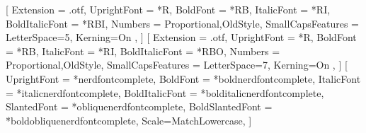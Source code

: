 \usepackage{ifpdf,ifluatex}

\usepackage{grffile}

\usepackage{indentfirst,xspace}

\usepackage{graphicx,xcolor}

\usepackage{booktabs}
\renewcommand{\arraystretch}{1.2}  %

\let\oldtabular\tabular
\let\endoldtabular\endtabular
\renewenvironment{tabular}[1]{\begin{oldtabular}{@{}#1@{}}}{\end{oldtabular}}

\usepackage{amsmath,amssymb}

\ifluatex
  \usepackage{fontspec}
  \setmainfont{LinLibertine_}[
    Extension = .otf,
    UprightFont = *R,
    BoldFont = *RB,
    ItalicFont = *RI,
    BoldItalicFont = *RBI,
    Numbers = {Proportional,OldStyle},
    SmallCapsFeatures = { LetterSpace=5, Kerning=On },
  ]
  \setsansfont{LinBiolinum_}[
    Extension = .otf,
    UprightFont = *R,
    BoldFont = *RB,
    ItalicFont = *RI,
    BoldItalicFont = *RBO,
    Numbers = {Proportional,OldStyle},
    SmallCapsFeatures = { LetterSpace=7, Kerning=On },
  ]
  \setmonofont{iosevkatermslab}[
    UprightFont = *nerdfontcomplete,
    BoldFont = *boldnerdfontcomplete,
    ItalicFont = *italicnerdfontcomplete,
    BoldItalicFont = *bolditalicnerdfontcomplete,
    SlantedFont = *obliquenerdfontcomplete,
    BoldSlantedFont = *boldobliquenerdfontcomplete,
    Scale=MatchLowercase,
  ]
  \usepackage{unicode-math}

  \newcommand\lfstyle{\addfontfeature{Numbers=Lining}}
  \newcommand\textlf[1]{{\lfstyle #1}}
\else
  \usepackage[T1]{fontenc}
  \usepackage[utf8]{inputenc}
  \usepackage[p,osf]{newtxtext}  %
  \usepackage{newtxmath}
\fi
\newcommand\Arabic[1]{\textlf{\arabic{#1}}}  %

\usepackage{siunitx,commath,xfrac}

